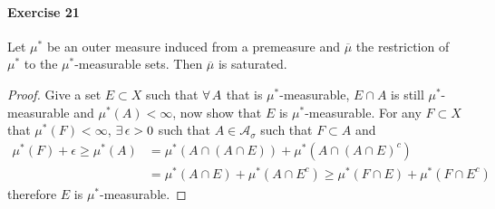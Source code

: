 \paragraph{Exercise 21}
    Let $\mu^*$ be an outer measure induced from a premeasure and $\overline{\mu}$ the restriction of $\mu^*$ to the $\mu^*$-measurable sets. Then $\overline{\mu}$ is saturated.
    \begin{proof}
        Give a set $E\subset X$ such that $\forall\, A$ that is $\mu^*$-measurable, $E\cap A$ is still $\mu^*$-measurable and $\mu^*(A)<\infty$, now show that $E$ is $\mu^*$-measurable. For any $F\subset X$ that $\mu^*(F)<\infty$, $\exists\, \epsilon>0$ such that $A\in\mathcal{A}_\sigma$ such that $F\subset A$ and 
        \begin{align*}
            \mu^*(F)+\epsilon\ge\mu^*(A)&=\mu^*(A\cap (A\cap E))+\mu^*(A\cap(A\cap E)^c)\\
            &=\mu^*(A\cap E)+\mu^*(A\cap E^c)\ge\mu^*(F\cap E)+\mu^*(F\cap E^c)
        \end{align*}
        therefore $E$ is $\mu^*$-measurable.
    \end{proof}
